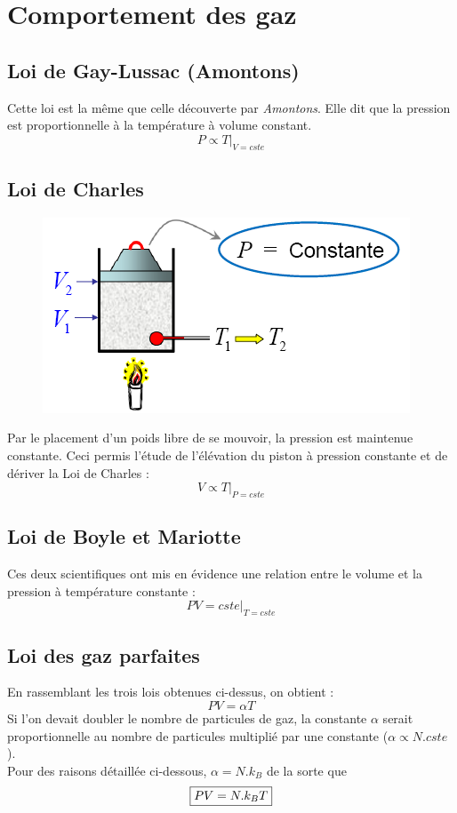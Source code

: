 \documentclass	[11pt, a4paper, openany]{book}
\begin{document}
\section{Comportement des gaz}
\subsection{Loi de Gay-Lussac (Amontons)}
Cette loi est la même que celle découverte par \textit{Amontons}. Elle dit que la pression est proportionnelle à la température à volume constant.
\begin{equation}
	P \propto T|_{V = cste}
\end{equation}

\subsection{Loi de Charles}
\begin{figure}
	\includegraphics[scale=0.23]{th/image5.png}
\end{figure}
Par le placement d'un poids libre de se mouvoir, la pression est maintenue constante. Ceci permis l'étude de l'élévation du piston à pression constante et de dériver la Loi de Charles :
\begin{equation}
	V \propto T|_{P = cste}
\end{equation}

\subsection{Loi de Boyle et Mariotte}
Ces deux scientifiques ont mis en évidence une relation entre le volume et la pression à température constante :
\begin{equation}
	PV = cste|_{T = cste}
\end{equation}

\subsection{Loi des gaz parfaites}
En rassemblant les trois lois obtenues ci-dessus, on obtient : 
\begin{equation}
	PV = \alpha T
\end{equation}
Si l'on devait doubler le nombre de particules de gaz, la constante $\alpha$ serait proportionnelle au nombre de particules multiplié par une constante ($\alpha \propto N.cste$).\\
Pour des raisons détaillée ci-dessous, $\alpha = N.k_B$ de la sorte que
\begin{equation}
	\fbox{$ PV = N.k_BT$}
\end{equation}
\end{document}
